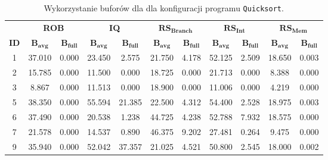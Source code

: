 \begin{table}[]
\centering
\caption{ Wykorzystanie buforów dla dla konfiguracji programu \texttt{Quicksort}. }
\label{tab:buffers_Quicksort}
\begin{tabular}{|c|cc|cc|cc|cc|cc|}
\hline& \multicolumn{2}{c|}{\textbf{ROB}} & \multicolumn{2}{c|}{\textbf{IQ}} & \multicolumn{2}{c|}{$\mathbf{RS_{Branch}}$} & \multicolumn{2}{c|}{$\mathbf{RS_{Int}}$} & \multicolumn{2}{c|}{$\mathbf{RS_{Mem}}$} \\ \cline{2-11}
\multirow{-2}{*}{\cellcolor[HTML]{EFEFEF}\textbf{ID}} & $\mathbf{B_{avg}}$ & \cellcolor[HTML]{EFEFEF}$\mathbf{B_{full}}$ & $\mathbf{B_{avg}}$ & \cellcolor[HTML]{EFEFEF}$\mathbf{B_{full}}$ & $\mathbf{B_{avg}}$ & \cellcolor[HTML]{EFEFEF}$\mathbf{B_{full}}$ & $\mathbf{B_{avg}}$ & \cellcolor[HTML]{EFEFEF}$\mathbf{B_{full}}$ & $\mathbf{B_{avg}}$ & \cellcolor[HTML]{EFEFEF}$\mathbf{B_{full}}$ \\ \hline
1 & 37.010 & \cellcolor[HTML]{EFEFEF}0.000 & 23.450 & \cellcolor[HTML]{EFEFEF}2.575 & 21.750 & \cellcolor[HTML]{EFEFEF}4.178 & 52.125 & \cellcolor[HTML]{EFEFEF}2.509 & 18.650 & \cellcolor[HTML]{EFEFEF}0.003 \\ \hline
2 & 15.785 & \cellcolor[HTML]{EFEFEF}0.000 & 11.500 & \cellcolor[HTML]{EFEFEF}0.000 & 18.725 & \cellcolor[HTML]{EFEFEF}0.000 & 21.713 & \cellcolor[HTML]{EFEFEF}0.000 & 8.388 & \cellcolor[HTML]{EFEFEF}0.000 \\ \hline
3 & 8.867 & \cellcolor[HTML]{EFEFEF}0.000 & 11.513 & \cellcolor[HTML]{EFEFEF}0.000 & 18.900 & \cellcolor[HTML]{EFEFEF}0.000 & 11.006 & \cellcolor[HTML]{EFEFEF}0.000 & 4.219 & \cellcolor[HTML]{EFEFEF}0.000 \\ \hline
5 & 38.350 & \cellcolor[HTML]{EFEFEF}0.000 & 55.594 & \cellcolor[HTML]{EFEFEF}21.385 & 22.500 & \cellcolor[HTML]{EFEFEF}4.312 & 54.400 & \cellcolor[HTML]{EFEFEF}2.528 & 18.975 & \cellcolor[HTML]{EFEFEF}0.003 \\ \hline
6 & 37.490 & \cellcolor[HTML]{EFEFEF}0.000 & 20.538 & \cellcolor[HTML]{EFEFEF}1.238 & 44.725 & \cellcolor[HTML]{EFEFEF}4.238 & 52.788 & \cellcolor[HTML]{EFEFEF}7.932 & 18.575 & \cellcolor[HTML]{EFEFEF}0.000 \\ \hline
7 & 21.578 & \cellcolor[HTML]{EFEFEF}0.000 & 14.537 & \cellcolor[HTML]{EFEFEF}0.890 & 46.375 & \cellcolor[HTML]{EFEFEF}9.202 & 27.481 & \cellcolor[HTML]{EFEFEF}0.264 & 9.475 & \cellcolor[HTML]{EFEFEF}0.000 \\ \hline
9 & 35.940 & \cellcolor[HTML]{EFEFEF}0.000 & 52.042 & \cellcolor[HTML]{EFEFEF}37.357 & 21.025 & \cellcolor[HTML]{EFEFEF}4.521 & 50.800 & \cellcolor[HTML]{EFEFEF}2.545 & 18.000 & \cellcolor[HTML]{EFEFEF}0.002 \\ \hline

\end{tabular}
\end{table}
